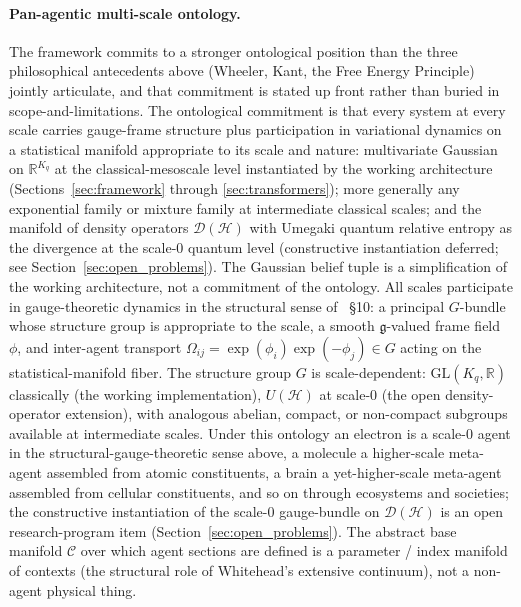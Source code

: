 \documentclass[11pt]{article}
\begin{document}
\paragraph{Pan-agentic multi-scale ontology.} The framework commits to a stronger ontological position than the three philosophical antecedents above (Wheeler, Kant, the Free Energy Principle) jointly articulate, and that commitment is stated up front rather than buried in scope-and-limitations. The ontological commitment is that every system at every scale carries gauge-frame structure plus participation in variational dynamics on a statistical manifold appropriate to its scale and nature: multivariate Gaussian on $\mathbb{R}^{K_q}$ at the classical-mesoscale level instantiated by the working architecture (Sections~\ref{sec:framework} through \ref{sec:transformers}); more generally any exponential family or mixture family at intermediate classical scales; and the manifold of density operators $\mathcal{D}(\mathcal{H})$ with Umegaki quantum relative entropy as the divergence at the scale-0 quantum level (constructive instantiation deferred; see Section~\ref{sec:open_problems}). The Gaussian belief tuple is a simplification of the working architecture, not a commitment of the ontology. All scales participate in gauge-theoretic dynamics in the structural sense of~\cite{Nakahara2003} \S 10: a principal $G$-bundle whose structure group is appropriate to the scale, a smooth $\mathfrak{g}$-valued frame field $\phi$, and inter-agent transport $\Omega_{ij} = \exp(\phi_i)\exp(-\phi_j) \in G$ acting on the statistical-manifold fiber. The structure group $G$ is scale-dependent: $\mathrm{GL}(K_q,\mathbb{R})$ classically (the working implementation), $U(\mathcal{H})$ at scale-0 (the open density-operator extension), with analogous abelian, compact, or non-compact subgroups available at intermediate scales. Under this ontology an electron is a scale-0 agent in the structural-gauge-theoretic sense above, a molecule a higher-scale meta-agent assembled from atomic constituents, a brain a yet-higher-scale meta-agent assembled from cellular constituents, and so on through ecosystems and societies; the constructive instantiation of the scale-0 gauge-bundle on $\mathcal{D}(\mathcal{H})$ is an open research-program item (Section~\ref{sec:open_problems}). The abstract base manifold $\mathcal{C}$ over which agent sections are defined is a parameter / index manifold of contexts (the structural role of Whitehead's extensive continuum), not a non-agent physical thing.
\end{document}

